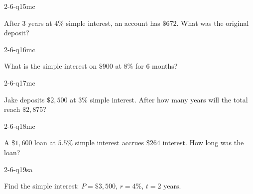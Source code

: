 \begin{practiceQuestion}{2-6-q15}{mc}
\begin{questionText}
After $3$ years at $4\%$ simple interest, an account has $\$672$. What was the original deposit?
\end{questionText}
\end{practiceQuestion}

\begin{practiceQuestion}{2-6-q16}{mc}
\begin{questionText}
What is the simple interest on $\$900$ at $8\%$ for $6$ months?
\end{questionText}
\end{practiceQuestion}

\begin{practiceQuestion}{2-6-q17}{mc}
\begin{questionText}
Jake deposits $\$2{,}500$ at $3\%$ simple interest. After how many years will the total reach $\$2{,}875$?
\end{questionText}
\end{practiceQuestion}

\begin{practiceQuestion}{2-6-q18}{mc}
\begin{questionText}
A $\$1{,}600$ loan at $5.5\%$ simple interest accrues $\$264$ interest. How long was the loan?
\end{questionText}
\end{practiceQuestion}


\begin{practiceQuestion}{2-6-q19}{sa}
\begin{questionText}
Find the simple interest: $P = \$3{,}500$, $r = 4\%$, $t = 2$ years.
\end{questionText}
\end{practiceQuestion}

